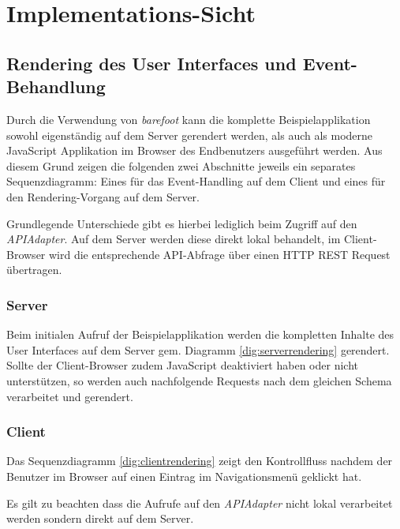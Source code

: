 \section{Implementations-Sicht}
\label{sec:sad-implementation}





\subsection{Rendering des User Interfaces und Event-Behandlung}
Durch die Verwendung von \emph{barefoot} \cite{Barefoot} kann die komplette Beispielapplikation sowohl eigenständig auf dem Server gerendert werden, als auch als moderne JavaScript Applikation im Browser des Endbenutzers ausgeführt werden. Aus diesem Grund zeigen die folgenden zwei Abschnitte jeweils ein separates Sequenzdiagramm: Eines für das Event-Handling auf dem Client und eines für den Rendering-Vorgang auf dem Server.

Grundlegende Unterschiede gibt es hierbei lediglich beim Zugriff auf den \emph{APIAdapter}. Auf dem Server werden diese direkt lokal behandelt, im Client-Browser wird die entsprechende API-Abfrage über einen HTTP \gls{REST} Request übertragen.

\subsubsection*{Server}
Beim initialen Aufruf der Beispielapplikation werden die kompletten Inhalte des User Interfaces auf dem Server gem. Diagramm \ref{dig:serverrendering} gerendert. Sollte der Client-Browser zudem JavaScript deaktiviert haben oder nicht unterstützen, so werden auch nachfolgende Requests nach dem gleichen Schema verarbeitet und gerendert.



\subsubsection*{Client}
Das Sequenzdiagramm \ref{dig:clientrendering} zeigt den Kontrollfluss nachdem der Benutzer im Browser auf einen Eintrag im Navigationsmenü geklickt hat.

Es gilt zu beachten dass die Aufrufe auf den \emph{APIAdapter} nicht lokal verarbeitet werden sondern direkt auf dem Server.

